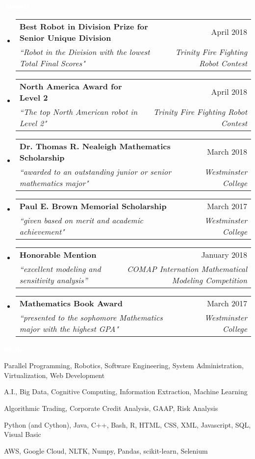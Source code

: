 \documentclass[letterpaper,11pt]{article}
\makeatletter
\newcommand{\resheading}[1]{{\large \colorbox{electricpurple}{\begin{minipage}{\textwidth}{\textbf{#1 \vphantom{p\^{E}}}}\end{minipage}}}}
\newcommand{\ressubheading}[4]{
	\begin{tabular*}{7.0in}{l@{\extracolsep{\fill}}r}
		\textbf{#1} & #2 \\
		\textit{#3} & \textit{#4} \\
	\end{tabular*}\vspace{-6pt}}
\makeatother
\begin{document}
		\resheading{\textcolor{white}{Awards}}

		\begin{itemize}[topsep=3pt, itemsep=1pt]
			\item
			\ressubheading{Best Robot in Division Prize for Senior Unique Division}{April 2018}{``Robot in the Division with the lowest Total Final Scores"}{Trinity Fire Fighting Robot Contest}
			\item
			\ressubheading{North America Award for Level 2}{April 2018}{``The top North American robot in Level 2"}{Trinity Fire Fighting Robot Contest}
			\item
			\ressubheading{Dr. Thomas R. Nealeigh Mathematics Scholarship}{March 2018}{``awarded to an outstanding junior or senior mathematics major"}{Westminster College}
			\item
			\ressubheading{Paul E. Brown Memorial Scholarship}{March 2017}{``given based on merit and academic achievement"}{Westminster College}
			\item
			\ressubheading{Honorable Mention}{January 2018}{``excellent modeling and sensitivity analysis''}{COMAP Internation Mathematical Modeling Competition}
			\item
			\ressubheading{Mathematics Book Award}{March 2017}{``presented to the sophomore Mathematics major with the highest GPA"}{Westminster College}
		\end{itemize}
	
	\resheading{\textcolor{white}{Skills}}
	
	\begin{description}[itemsep=1pt]
		\item[Computer Science:]  Parallel Programming, Robotics, Software Engineering, System Administration, Virtualization, Web Development
		\item[Data Science:] A.I., Big Data, Cognitive Computing, Information Extraction, Machine Learning
		\item[Finance and Economics:] Algorithmic Trading, Corporate Credit Analysis, GAAP, Risk Analysis
		\item[Languages:] Python (and Cython), Java, C++, Bash, R, HTML, CSS, XML, Javascript, SQL, Visual Basic
		\item[Software \& Tools:] AWS, Google Cloud, NLTK, Numpy, Pandas, scikit-learn, Selenium
	\end{description}
	
\end{document}

